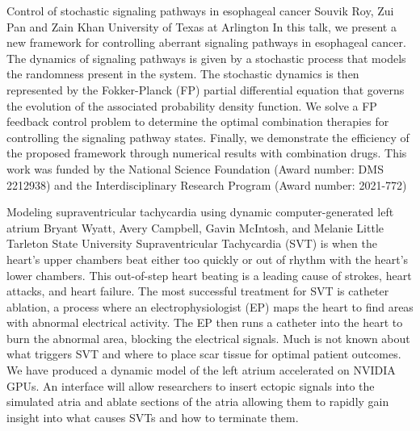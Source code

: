 \vspace{1.5ex}
\abs
{Control of stochastic signaling pathways in esophageal cancer}
{Souvik Roy, Zui Pan and Zain Khan}
{University of Texas at Arlington}
{In this talk, we present a new framework for controlling aberrant signaling pathways in esophageal cancer. The dynamics of signaling pathways is given by a stochastic process that models the randomness present in the system. The stochastic dynamics is then represented by the Fokker-Planck (FP) partial differential equation that governs the evolution of the associated probability density function. We solve a FP feedback control problem to determine the optimal combination therapies for controlling the signaling pathway states. Finally, we demonstrate the efficiency of the proposed framework through numerical results with combination drugs. This work was funded by the National Science Foundation (Award number: DMS 2212938) and the Interdisciplinary Research Program (Award number: 2021-772)}


\vspace{1.5ex}
\abs
{Modeling supraventricular tachycardia using dynamic computer-generated left atrium}
{Bryant Wyatt, Avery Campbell, Gavin McIntosh, and Melanie Little}
{Tarleton State University}
{Supraventricular Tachycardia (SVT) is when the heart’s upper chambers beat either too quickly or out of rhythm with the heart’s lower chambers. This out-of-step heart beating is a leading cause of strokes, heart attacks, and heart failure. The most successful treatment for SVT is catheter ablation, a process where an electrophysiologist (EP) maps the heart to find areas with abnormal electrical activity. The EP then runs a catheter into the heart to burn the abnormal area, blocking the electrical signals. Much is not known about what triggers SVT and where to place scar tissue for optimal patient outcomes. We have produced a dynamic model of the left atrium accelerated on NVIDIA GPUs. An interface will allow researchers to insert ectopic signals into the simulated atria and ablate sections of the atria allowing them to rapidly gain insight into what causes SVTs and how to terminate them.}


